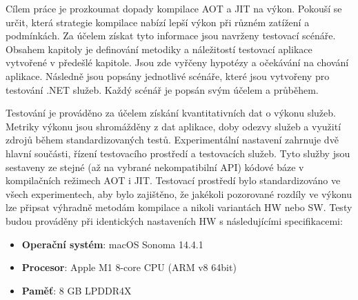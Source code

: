 


Cílem práce je prozkoumat dopady kompilace AOT a JIT na výkon. Pokouší se určit, která strategie kompilace nabízí lepší výkon při různém zatížení a podmínkách. Za účelem získat tyto informace jsou navrženy testovací scénáře. Obsahem kapitoly je definování metodiky a náležitostí testovací aplikace vytvořené v předešlé kapitole. Jsou zde vyřčeny hypotézy a očekávání na chování aplikace. Následně jsou popsány jednotlivé scénáře, které jsou vytvořeny pro testování .NET služeb. Každý scénář je popsán svým účelem a průběhem.


Testování je prováděno za účelem získání kvantitativních dat o výkonu služeb. Metriky výkonu jsou shromážděny z dat aplikace, doby odezvy služeb a využití zdrojů během standardizovaných testů. Experimentální nastavení zahrnuje dvě hlavní součásti, řízení testovacího prostředí a testovacích služeb. Tyto služby jsou sestaveny ze stejné (až na vybrané nekompatibilní API) kódové báze v kompilačních režimech AOT i JIT. Testovací prostředí bylo standardizováno ve všech experimentech, aby bylo zajištěno, že jakékoli pozorované rozdíly ve výkonu lze připsat výhradně metodám kompilace a nikoli variantách HW nebo SW. Testy budou prováděny při identických nastaveních HW s následujícími specifikacemi:

\begin{itemize}
    \item \textbf{Operační systém}: macOS Sonoma 14.4.1
    \item \textbf{Procesor}: Apple M1 8-core CPU (ARM v8 64bit)
    \item \textbf{Paměť}: 8 GB LPDDR4X
\end{itemize}

